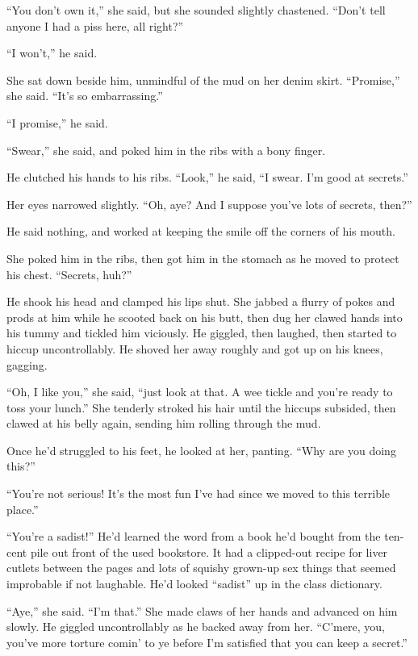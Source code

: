 \documentclass{article}
\begin{document}
``You don't own it,'' she said, but she sounded slightly chastened. 
``Don't tell anyone I had a piss here, all right?''

``I won't,'' he said.

She sat down beside him, unmindful of the mud on her denim skirt. 
``Promise,'' she said.  ``It's so embarrassing.''

``I promise,'' he said.

``Swear,'' she said, and poked him in the ribs with a bony finger.

He clutched his hands to his ribs.  ``Look,'' he said, ``I swear.  I'm
good at secrets.''

Her eyes narrowed slightly.  ``Oh, aye?  And I suppose you've lots of
secrets, then?''

He said nothing, and worked at keeping the smile off the corners of
his mouth.

She poked him in the ribs, then got him in the stomach as he moved to
protect his chest.  ``Secrets, huh?''

He shook his head and clamped his lips shut.  She jabbed a flurry of
pokes and prods at him while he scooted back on his butt, then dug her
clawed hands into his tummy and tickled him viciously.  He giggled,
then laughed, then started to hiccup uncontrollably.  He shoved her
away roughly and got up on his knees, gagging.

``Oh, I like you,'' she said, ``just look at that.  A wee tickle and
you're ready to toss your lunch.'' She tenderly stroked his hair until
the hiccups subsided, then clawed at his belly again, sending him
rolling through the mud.

Once he'd struggled to his feet, he looked at her, panting.  ``Why are
you doing this?''

``You're not serious!  It's the most fun I've had since we moved to
this terrible place.''

``You're a sadist!'' He'd learned the word from a book he'd bought
from the ten-cent pile out front of the used bookstore.  It had a
clipped-out recipe for liver cutlets between the pages and lots of
squishy grown-up sex things that seemed improbable if not laughable. 
He'd looked ``sadist'' up in the class dictionary.

``Aye,'' she said.  ``I'm that.'' She made claws of her hands and
advanced on him slowly.  He giggled uncontrollably as he backed away
from her.  ``C'mere, you, you've more torture comin' to ye before I'm
satisfied that you can keep a secret.''
\end{document}

